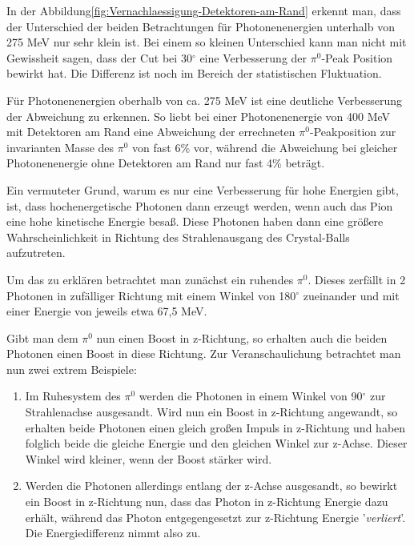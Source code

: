 \documentclass[a4paper,11pt,oneside,final,german,openbib,pdftex]{scrbook}
\begin{document}
{ 

In der Abbildung\ref{fig:Vernachlaessigung-Detektoren-am-Rand} erkennt man, dass der Unterschied der beiden Betrachtungen f\"ur Photonenenergien unterhalb von 275 MeV nur sehr klein ist. Bei einem so kleinen Unterschied kann man nicht mit Gewissheit sagen, dass der Cut bei 30$^{\circ}$ eine Verbesserung der $\pi^0$-Peak Position bewirkt hat. Die Differenz ist noch im Bereich der statistischen Fluktuation. 

F\"ur Photonenenergien oberhalb von ca. 275 MeV ist eine deutliche Verbesserung der Abweichung zu erkennen. So liebt bei einer Photonenenergie von 400 MeV mit Detektoren am Rand eine Abweichung der errechneten $\pi^0$-Peakposition zur invarianten Masse des $\pi^0$ von fast 6\% vor, w\"ahrend die Abweichung bei gleicher Photonenenergie ohne Detektoren am Rand nur fast 4\% betr\"agt.

Ein vermuteter Grund, warum es nur eine Verbesserung für hohe Energien gibt, ist, dass hochenergetische Photonen dann erzeugt werden, wenn auch das Pion eine hohe kinetische Energie besa{\ss}. Diese Photonen haben dann eine gr\"o{\ss}ere Wahrscheinlichkeit in Richtung des Strahlenausgang des Crystal-Balls aufzutreten.

Um das zu erkl\"aren betrachtet man zun\"achst ein ruhendes $\pi^0$. Dieses zerf\"allt in 2 Photonen in zuf\"alliger Richtung mit einem Winkel von 180$^{\circ}$ zueinander und mit einer Energie von jeweils etwa 67,5 MeV. 

Gibt man dem $\pi^0$ nun einen Boost in z-Richtung, so erhalten auch die beiden Photonen einen Boost in diese Richtung.
Zur Veranschaulichung betrachtet man nun zwei extrem Beispiele:

\begin{enumerate}
	\item Im Ruhesystem des $\pi^0$ werden die Photonen in einem Winkel von 90$^{\circ}$ zur Strahlenachse ausgesandt. Wird nun ein Boost in z-Richtung angewandt, so erhalten beide Photonen einen gleich gro{\ss}en Impuls in z-Richtung und haben folglich beide die gleiche Energie und den gleichen Winkel zur z-Achse. Dieser Winkel wird kleiner, wenn der Boost st\"arker wird.
	\item Werden die Photonen allerdings entlang der z-Achse ausgesandt, so bewirkt ein Boost in z-Richtung nun, dass das Photon in z-Richtung Energie dazu erh\"alt, w\"ahrend das Photon entgegengesetzt zur z-Richtung Energie '\textit{verliert}'. Die Energiedifferenz nimmt also zu.
\end{enumerate}

}
\end{document}
